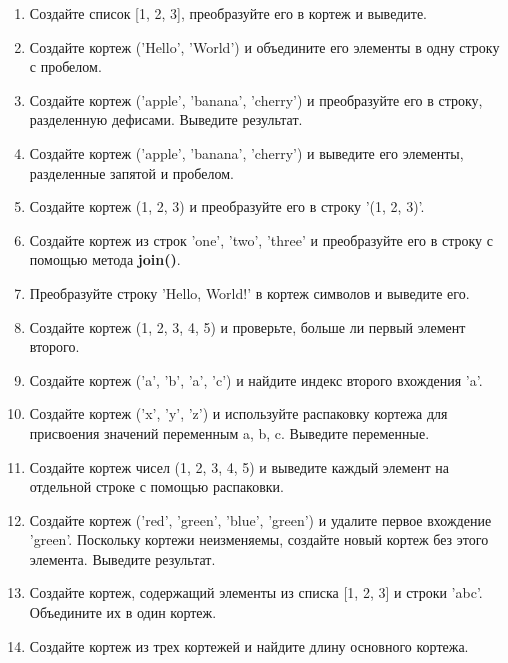 \documentclass[a4,12pt]{article}
\theoremstyle{remark}
\begin{document}
\begin{enumerate}
    \item Создайте список [1, 2, 3], преобразуйте его в кортеж и выведите.
    \item Создайте кортеж ('Hello', 'World') и объедините его элементы в одну строку с пробелом.
    \item Создайте кортеж ('apple', 'banana', 'cherry') и преобразуйте его в строку, разделенную дефисами. Выведите результат.
    \item Создайте кортеж ('apple', 'banana', 'cherry') и выведите его элементы, разделенные запятой и пробелом.
    \item Создайте кортеж (1, 2, 3) и преобразуйте его в строку '(1, 2, 3)'.
    \item Создайте кортеж из строк 'one', 'two', 'three' и преобразуйте его в строку с помощью метода \textbf{join()}.
    \item Преобразуйте строку 'Hello, World!' в кортеж символов и выведите его.
    \item Создайте кортеж (1, 2, 3, 4, 5) и проверьте, больше ли первый элемент второго.
    \item Создайте кортеж ('a', 'b', 'a', 'c') и найдите индекс второго вхождения 'a'.
    \item Создайте кортеж ('x', 'y', 'z') и используйте распаковку кортежа для присвоения значений переменным a, b, c. Выведите переменные.
    \item Создайте кортеж чисел (1, 2, 3, 4, 5) и выведите каждый элемент на отдельной строке с помощью распаковки.
    \item Создайте кортеж ('red', 'green', 'blue', 'green') и удалите первое вхождение 'green'. Поскольку кортежи неизменяемы, создайте новый кортеж без этого элемента. Выведите результат.
    \item Создайте кортеж, содержащий элементы из списка [1, 2, 3] и строки 'abc'. Объедините их в один кортеж.
    \item Создайте кортеж из трех кортежей и найдите длину основного кортежа.




















\end{enumerate}
\end{document}

